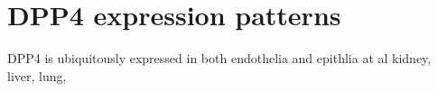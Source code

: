 \section{DPP4 expression patterns}
DPP4 is ubiquitously expressed in both endothelia and epithlia at al kidney, liver, lung, 